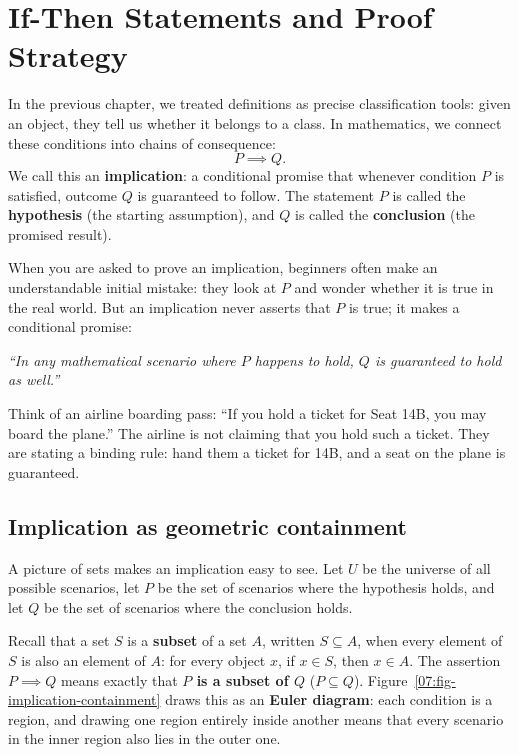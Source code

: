 \section{If-Then Statements and Proof Strategy}
\chapterline

In the previous chapter, we treated definitions as precise classification tools: given an object, they tell us whether it belongs to a class. In mathematics, we connect these conditions into chains of consequence:
\[
P \implies Q.
\]
We call this an \textbf{implication}: a conditional promise that whenever condition $P$ is satisfied, outcome $Q$ is guaranteed to follow. The statement $P$ is called the \textbf{hypothesis} (the starting assumption), and $Q$ is called the \textbf{conclusion} (the promised result).

When you are asked to prove an implication, beginners often make an understandable initial mistake: they look at $P$ and wonder whether it is true in the real world. But an implication never asserts that $P$ is true; it makes a conditional promise:
\begin{center}
\itshape ``In any mathematical scenario where $P$ happens to hold, $Q$ is guaranteed to hold as well.''
\end{center}
Think of an airline boarding pass: ``If you hold a ticket for Seat 14B, you may board the plane.'' The airline is not claiming that you hold such a ticket. They are stating a binding rule: hand them a ticket for 14B, and a seat on the plane is guaranteed.

\subsection{Implication as geometric containment}

A picture of sets makes an implication easy to see. Let $U$ be the universe of all possible scenarios, let $P$ be the set of scenarios where the hypothesis holds, and let $Q$ be the set of scenarios where the conclusion holds.

Recall that a set $S$ is a \textbf{subset} of a set $A$, written $S \subseteq A$, when every element of $S$ is also an element of $A$: for every object $x$, if $x \in S$, then $x \in A$. The assertion $P \implies Q$ means exactly that \textbf{$P$ is a subset of $Q$} ($P \subseteq Q$). Figure~\ref{07:fig-implication-containment} draws this as an \textbf{Euler diagram}: each condition is a region, and drawing one region entirely inside another means that every scenario in the inner region also lies in the outer one.

